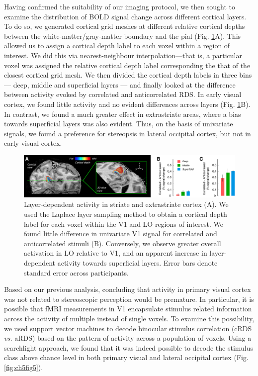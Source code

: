 Having confirmed the suitability of our imaging protocol, we then sought to examine the distribution of BOLD signal change across different cortical layers. To do so, we generated cortical grid meshes at different relative cortical depths between the white-matter/gray-matter boundary and the pial (Fig. \ref{fig:ch5fig4}A). This allowed us to assign a cortical depth label to each voxel within a region of interest. We did this via nearest-neighbour interpolation---that is, a particular voxel was assigned the relative cortical depth label corresponding the that of the closest cortical grid mesh. We then divided the cortical depth labels in three bins --- deep, middle and superficial layers --- and finally looked at the difference between activity evoked by correlated and anticorrelated RDS. In early visual cortex, we found little activity and no evident differences across layers (Fig. \ref{fig:ch5fig4}B). In contrast, we found a much greater effect in extrastriate areas, where a bias towards superficial layers was also evident. Thus, on the basis of univariate signals, we found a preference for stereopsis in lateral occipital cortex, but not in early visual cortex.

\begin{figure}
  \centering
  \includegraphics[keepaspectratio,width=14cm]{Fig4.pdf}
  \caption[Layer-dependent activity in striate and extrastriate cortex.]{Layer-dependent activity in striate and extrastriate cortex (A). We used the Laplace layer sampling method \cite{Jones:2000cr} to obtain a cortical depth label for each voxel within the V1 and LO regions of interest. We found little difference in univariate V1 signal for correlated and anticorrelated stimuli (B). Conversely, we observe greater overall activation in LO relative to V1, and an apparent increase in layer-dependent activity towards superficial layers. Error bars denote standard error across participants.}
  \label{fig:ch5fig4}
\end{figure}

Based on our previous analysis, concluding that activity in primary visual cortex was not related to stereoscopic perception would be premature. In particular, it is possible that fMRI measurements in V1 encapsulate stimulus related information across the activity of multiple instead of single voxels. To examine this possibility, we used support vector machines to decode binocular stimulus correlation (cRDS \textit{vs.} aRDS) based on the pattern of activity across a population of voxels. Using a searchlight approach, we found that it was indeed possible to decode the stimulus class above chance level in both primary visual and lateral occipital cortex (Fig. \ref{fig:ch5fig5}).

